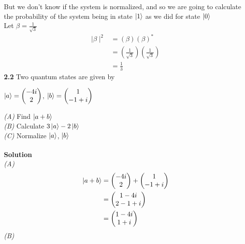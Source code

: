\documentclass{article}
\begin{document}
But we don't know if the system is normalized, and so we are going to calculate the probability of the system being in state $\ket{1}$ as we did for state $\ket{0}$\\
Let $\beta = \frac{1}{\sqrt{3}}$\\
\begin{align*}
\mid\beta\mid^2 &= (\beta)(\beta)^*\\
&= (\frac{1}{\sqrt{3}})(\frac{1}{\sqrt{3}})\\
&= \frac{1}{3}
\end{align*}
\textbf{2.2} Two quantum states are given by\\
\begin{center}
$\ket{a} = \begin{pmatrix} -4i \\ 2 \end{pmatrix}$,   $\ket{b} = \begin{pmatrix} 1 \\ -1 + i \end{pmatrix}$
\end{center}
\textit{(A)} Find $\ket{a + b}$\\
\textit{(B)} Calculate $3\ket{a} - 2\ket{b}$\\
\textit{(C)} Normalize $\ket{a}$, $\ket{b}$\\ \\
\textbf{Solution}\\
\textit{(A)}
\begin{align*}
\ket{a + b} &= \begin{pmatrix} -4i \\ 2 \end{pmatrix} + \begin{pmatrix} 1 \\ -1 + i \end{pmatrix}\\
&= \begin{pmatrix} 1-4i \\ 2-1+i \end{pmatrix}\\
&= \begin{pmatrix} 1-4i \\ 1+i \end{pmatrix}\\
\end{align*}
\textit{(B)} 
\end{document}
